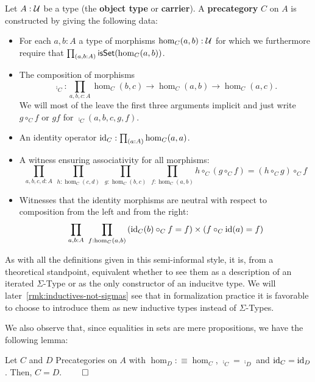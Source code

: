 \begin{defn}[Precategory] \label{def:hott-precat}
Let $A : \mathcal{U}$ be a type (the \textbf{object type} or \textbf{carrier}). A
\textbf{precategory} $C$ on $A$ is constructed by giving the following data:
\begin{itemize}
\item For each $a, b : A$ a type of morphisms $\hom_C(a, b) : \mathcal{U}$ for which we furthermore
require that $\prod_{(a,b:A)} \mathsf{isSet}(\hom_C(a, b))$.
\item The composition of morphisms
\begin{equation*}
\comp_C : \prod_{a,b,c:A} \hom_C(b, c) \to \hom_C(a, b) \to \hom_C(a, c) \text{.}
\end{equation*}
We will most of the leave the first three arguments implicit and just write
$g \circ_C f$ or $gf$ for $\comp_C(a,b,c,g,f)$.
\item An identity operator $\operatorname{id}_C : \prod_{(a:A)} \hom_C(a,a)$.
\item A witness ensuring associativity for all morphisms:
\begin{equation*}
\prod_{a,b,c,d:A} ~ \prod_{h:\hom_C(c,d)} ~ \prod_{g:\hom_C(b,c)} ~ \prod_{f:\hom_C(a,b)}
h \circ_C (g \circ_C f) = (h \circ_C g) \circ_C f
\end{equation*}
\item Witnesses that the identity morphisms are neutral with respect to composition
from the left and from the right:
\begin{equation*}
\prod_{a, b : A} ~ \prod_{f : \hom_C(a, b)}
\left(\operatorname{id}_C(b) \circ_C f = f\right) \times \left(f \circ_C \operatorname{id}(a) = f\right)
\end{equation*}
\end{itemize}
\end{defn}

As with all the definitions given in this semi-informal style, it is, from a
theoretical standpoint, equivalent whether to see them as a description of an
iterated $\Sigma$-Type or as the only constructor of an inducitve type.
We will later~\ref{rmk:inductives-not-sigmas} see that in formalization practice
it is favorable to choose to introduce them as new inductive types instead of
$\Sigma$-Types.

We also observe that, since equalities in sets are mere propositions, we have the
following lemma:
\begin{lemma} \label{thm:hott-eq-precat}
Let $C$ and $D$ Precategories on $A$ with $\hom_D :\equiv \hom_C$, 
$\comp_C = \comp_D$ and $\operatorname{id}_C = \operatorname{id}_D$.
Then, $C = D$. \hfill $\qed$
\end{lemma}

